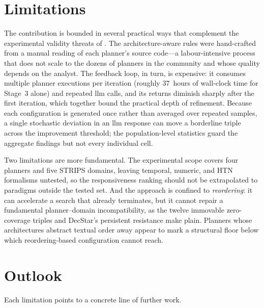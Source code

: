 \section{Limitations}
\label{sec:concl:limitations}

The contribution is bounded in several practical ways that complement the experimental validity threats of .
The architecture-aware rules were hand-crafted from a manual reading of each planner's source code---a labour-intensive process that does not scale to the dozens of planners in the community and whose quality depends on the analyst.
The feedback loop, in turn, is expensive: it consumes multiple planner executions per iteration (roughly 37~hours of wall-clock time for Stage~3 alone) and repeated \gls{llm} calls, and its returns diminish sharply after the first iteration, which together bound the practical depth of refinement.
Because each configuration is generated once rather than averaged over repeated samples, a single stochastic deviation in an \gls{llm} response can move a borderline triple across the improvement threshold; the population-level statistics guard the aggregate findings but not every individual cell.

Two limitations are more fundamental.
The experimental scope covers four planners and five STRIPS domains, leaving temporal, numeric, and HTN formalisms untested, so the responsiveness ranking should not be extrapolated to paradigms outside the tested set.
And the approach is confined to \emph{reordering}: it can accelerate a search that already terminates, but it cannot repair a fundamental planner--domain incompatibility, as the twelve immovable zero-coverage triples and DecStar's persistent resistance make plain.
Planners whose architectures abstract textual order away appear to mark a structural floor below which reordering-based configuration cannot reach.

\section{Outlook}
\label{sec:concl:future_work}

Each limitation points to a concrete line of further work.

